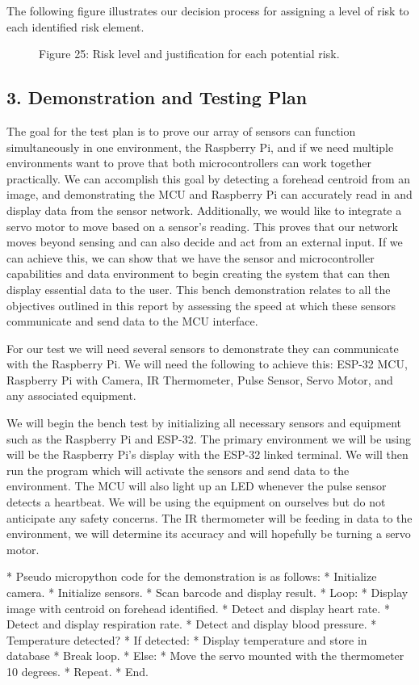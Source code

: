 ﻿\documentclass[10pt]{article}
\begin{document}
The following figure illustrates our decision process for assigning a level of risk to each identified risk element. 
\begin{figure}
\caption{Figure 25: Risk level and justification for each potential risk.}
\label{fig:25}
\end{figure}
  
\subsection{3. Demonstration and Testing Plan}
The goal for the test plan is to prove our array of sensors can function simultaneously in one environment, the Raspberry Pi, and if we need multiple environments want to prove that both microcontrollers can work together practically. We can accomplish this goal by detecting a forehead centroid from an image, and demonstrating the MCU and Raspberry Pi can accurately read in and display data from the sensor network. Additionally, we would like to integrate a servo motor to move based on a sensor’s reading. This proves that our network moves beyond sensing and can also decide and act from an external input. If we can achieve this, we can show that we have the sensor and microcontroller capabilities and data environment to begin creating the system that can then display essential data to the user. This bench demonstration relates to all the objectives outlined in this report by assessing the speed at which these sensors communicate and send data to the MCU interface. 

For our test we will need several sensors to demonstrate they can communicate with the Raspberry Pi. We will need the following to achieve this: ESP-32 MCU, Raspberry Pi with Camera, IR Thermometer, Pulse Sensor, Servo Motor, and any associated equipment. 

We will begin the bench test by initializing all necessary sensors and equipment such as the Raspberry Pi and ESP-32. The primary environment we will be using will be the Raspberry Pi’s display with the ESP-32 linked terminal. We will then run the program which will activate the sensors and send data to the environment. The MCU will also light up an LED whenever the pulse sensor detects a heartbeat. We will be using the equipment on ourselves but do not anticipate any safety concerns. The IR thermometer will be feeding in data to the environment, we will determine its accuracy and will hopefully be turning a servo motor. 

* Pseudo micropython code for the demonstration is as follows:
   * Initialize camera.
   * Initialize sensors.
   * Scan barcode and display result.
   * Loop:
      * Display image with centroid on forehead identified. 
      * Detect and display heart rate.
      * Detect and display respiration rate.
      * Detect and display blood pressure.
      * Temperature detected?
      * If detected:
         * Display temperature and store in database
         * Break loop.
      * Else:
         * Move the servo mounted with the thermometer 10 degrees.
         * Repeat.
   * End.
\end{document}
